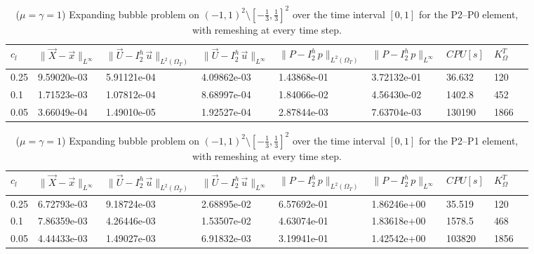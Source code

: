 \documentclass[a4paper,12pt,onecolumn]{article}
\newcommand{\errorXx}{\|\vec{X} - \vec{x}\|_{L^\infty}}
\newcommand{\LerrorUu}[1]{\|\vec U - I^h_{#1}\,\vec u\|_{L^2(\Omega_T)}}
\newcommand{\errorUu}[1]{\|\vec U - I^h_{#1}\,\vec u\|_{L^\infty}}
\newcommand{\errorPp}[1]{\|P - I^h_{#1}\,p\|_{L^\infty}}
\newcommand{\LerrorPp}[1]{\|P - I^h_{#1}\,p\|_{L^2(\Omega_T)}}
\begin{document}
\begin{table}
 \center
 \hspace*{-2cm}
\begin{tabular}{lllllllll}
\hline
$c_l$ & $\errorXx$ & $\LerrorUu2$ & $\errorUu2$ & $\LerrorPp2$ & $\errorPp2$ & $CPU[s]$ & $K_\Omega^T$\\
\hline
0.25 & 9.59020e-03 & 5.91121e-04 & 4.09862e-03 & 1.43868e-01 & 3.72132e-01 & 36.632 & 120\\
0.1 & 1.71523e-03 & 1.07812e-04 & 8.68997e-04 & 1.84066e-02 & 4.56430e-02 & 1402.8 & 452\\
0.05 & 3.66049e-04 & 1.49010e-05 & 1.92527e-04 & 2.87844e-03 & 7.63704e-03 & 130190 & 1866\\%
\hline
\end{tabular}
\hspace*{-2cm}
\caption{($\mu=\gamma=1$) Expanding bubble problem on $(-1,1)^2\setminus[-\frac{1}{3},\frac{1}{3}]^2$ over the time interval $[0,1]$ for the P2--P0 element, with remeshing at every time step.}
\label{tab:expandingbubble2Dp2p0remesh}
\end{table}

\begin{table}
 \center
 \hspace*{-2cm}
\begin{tabular}{lllllllll}
\hline
$c_l$ & $\errorXx$ & $\LerrorUu2$ & $\errorUu2$ & $\LerrorPp2$ & $\errorPp2$ & $CPU[s]$ & $K_\Omega^T$\\
\hline
0.25 & 6.72793e-03 & 9.18724e-03 & 2.68895e-02 & 6.57692e-01 & 1.86246e+00 & 35.519 & 120\\
0.1 & 7.86359e-03 & 4.26446e-03 & 1.53507e-02 & 4.63074e-01 & 1.83618e+00 & 1578.5 & 468\\
0.05 & 4.44433e-03 & 1.49027e-03 & 6.91832e-03 & 3.19941e-01 & 1.42542e+00 & 103820 & 1856\\%
\hline
\end{tabular}
\hspace*{-2cm}
\caption{($\mu=\gamma=1$) Expanding bubble problem on $(-1,1)^2\setminus[-\frac{1}{3},\frac{1}{3}]^2$ over the time interval $[0,1]$ for the P2--P1 element, with remeshing at every time step.}
\label{tab:expandingbubble2Dp2p1remesh}
\end{table}
\end{document}
